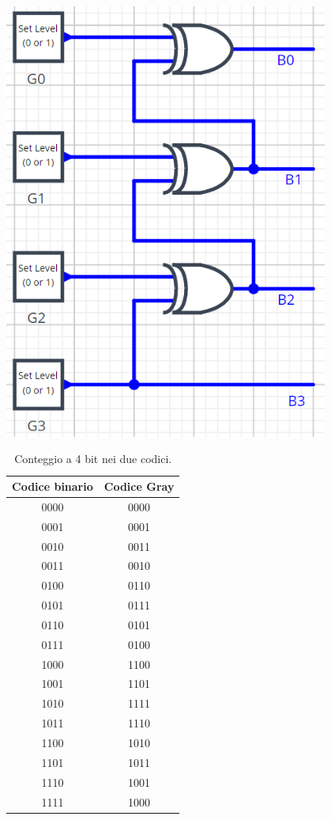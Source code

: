 \documentclass[10pt, a4paper, italian]{article}
\begin{document}
\begin{minipage}{0.5\textwidth}
    \centering
    \includegraphics[width=0.8\textwidth]{gb.png}
    \label{gb}
\end{minipage}

\begin{table}[htbp]
    \centering
    \begin{tabular}{c||c}
        Codice binario & Codice Gray \\
        \hline
        \hline
        0000 & 0000\\
        0001 & 0001\\
        0010 & 0011\\
        0011 & 0010\\
        0100 & 0110\\
        0101 & 0111\\
        0110 & 0101\\
        0111 & 0100\\
        1000 & 1100\\
        1001 & 1101\\
        1010 & 1111\\
        1011 & 1110\\
        1100 & 1010\\
        1101 & 1011\\
        1110 & 1001\\
        1111 & 1000\\
        \end{tabular}
    \caption{Conteggio a 4 bit nei due codici.}
    \label{tab: grbin}
\end{table}
\end{document}
